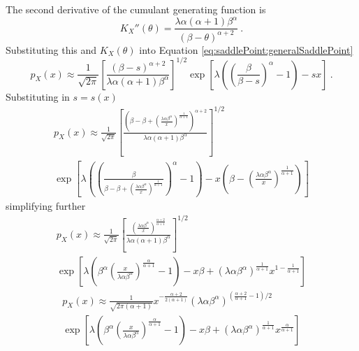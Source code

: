 The second derivative of the cumulant generating function is
\begin{equation}
  K_X''(\theta)=\frac{\lambda\alpha(\alpha+1)\beta^\alpha}{(\beta-\theta)^{\alpha+2}} \ .
\end{equation}
Substituting this and $K_X(\theta)$ into Equation \eqref{eq:saddlePoint:generalSaddlePoint}
\begin{equation*}
  p_X(x)\approx
  \frac{1}{\sqrt{2\pi}}
  \left[
    \frac{
      (\beta-s)^{\alpha+2}
    }
    {
      \lambda\alpha(\alpha+1)\beta^\alpha
    }
  \right]^{1/2}
  \exp\left[
    \lambda\left(\left(\frac{\beta}{\beta-s}\right)^\alpha-1\right)-sx
  \right]
  \ .
\end{equation*}
Substituting in $s=s(x)$
\begin{multline*}
  p_X(x)\approx
  \frac{1}{\sqrt{2\pi}}
  \left[
    \frac{\left(\beta-\beta+\left(\frac{\lambda\alpha\beta^\alpha}{x}\right)^{\frac{1}{\alpha+1}}\right)^{\alpha+2}}{\lambda\alpha(\alpha+1)\beta^\alpha}
  \right]^{1/2}
  \\
  \exp\left[
    \lambda
    \left(
      \left(
        \frac{\beta}{\beta-\beta+\left(\frac{\lambda\alpha\beta^\alpha}{x}\right)^{\frac{1}{\alpha+1}}}
      \right)^\alpha
      -1
    \right)
    -x\left(
      \beta-\left(\frac{\lambda\alpha\beta^\alpha}{x}\right)^{\frac{1}{\alpha+1}}
    \right)
  \right]
\end{multline*}
simplifying further
\begin{multline*}
  p_X(x)\approx
  \frac{1}{\sqrt{2\pi}}
  \left[
    \frac{
      \left(\frac{\lambda\alpha\beta^\alpha}{x}\right)^{\frac{\alpha+2}{\alpha+1}}
    }
    {
      \lambda\alpha(\alpha+1)\beta^\alpha
    }
  \right]^{1/2}
  \\
  \exp\left[
    \lambda
    \left(
      \beta^\alpha
      \left(\frac{x}{\lambda\alpha\beta^\alpha}\right)^{\frac{\alpha}{\alpha+1}}
      -1
    \right)
    -x\beta
    +(\lambda\alpha\beta^\alpha)^{\frac{1}{\alpha+1}}x^{1-\frac{1}{\alpha+1}}
  \right]
\end{multline*}
\begin{multline*}
  p_X(x)\approx
  \frac{1}{\sqrt{2\pi(\alpha+1)}}x^{-\frac{\alpha+2}{2(\alpha+1)}}
  \left(\lambda\alpha\beta^\alpha\right)^{\left(\frac{\alpha+2}{\alpha+1}-1\right)/2}
  \\
  \exp\left[
    \lambda\left(
      \beta^\alpha
      \left(\frac{x}{\lambda\alpha\beta^\alpha}\right)^{\frac{\alpha}{\alpha+1}}
      -1
    \right)
    -x\beta
    +(\lambda\alpha\beta^\alpha)^{\frac{1}{\alpha+1}}x^{\frac{\alpha}{\alpha+1}}
  \right]
\end{multline*}
